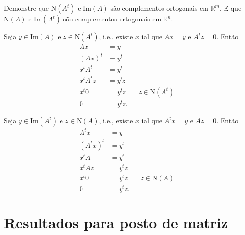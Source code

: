 \documentclass[a4paper,12pt, leqno, answers]{exam}
\newcommand{\EI}{\text{Im}}
\newcommand{\EN}{\text{N}}
\begin{document}
\begin{questions}
\begin{solution}
        \begin{center}
        \end{center}
    \end{solution}

    \question Demonstre que $\EN (A^t)$ e $\EI (A)$ s\~{a}o complementos ortogonais em $\mathbb{R}^m$. E que $\EN (A)$ e $\EI (A^t)$ s\~{a}o complementos ortogonais em $\mathbb{R}^n$.
    \begin{solution}
        Seja $y \in \EI (A)$ e $z \in \EN (A^t)$, i.e., existe $x$ tal que $A x = y$ e $A^t z = 0$. Ent\~{a}o
        \begin{align*}
            A x &= y \\
            \left( A x \right)^t &= y^t \\
            x^t A^t &= y^t \\
            x^t A^t z &= y^t z \\
            x^t 0 &= y^t z && z \in \EN (A^t) \\
            0 &= y^t z.
        \end{align*}

        Seja $y \in \EI (A^t)$ e $z \in \EN(A)$, i.e., existe $x$ tal que $A^t x = y$ e $A z = 0$. Ent\~{a}o
        \begin{align*}
            A^t x &= y \\
            \left( A^t x \right)^t &= y^t \\
            x^t A &= y^t \\
            x^t A z &= y^t z \\
            x^t 0 &= y^t z && z \in \EN (A) \\
            0 &= y^t z.
        \end{align*}
    \end{solution}

    \section*{Resultados para posto de matriz}


\end{questions}
\end{document}
